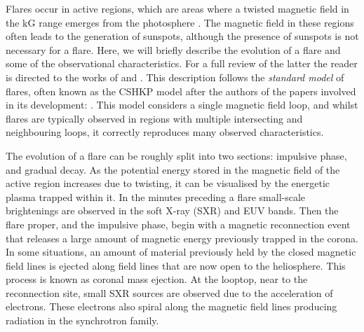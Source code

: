 Flares occur in active regions, which are areas where a twisted magnetic field in the kG range emerges from the photosphere \citep[For a review of active region evolution see][]{VanDriel-Gesztelyi2015}.
The magnetic field in these regions often leads to the generation of sunspots, although the presence of sunspots is not necessary for a flare.
Here, we will briefly describe the evolution of a flare and some of the observational characteristics.
For a full review of the latter the reader is directed to the works of \citet{Benz2008} and \citet{Fletcher2011}.
This description follows the \emph{standard model} of flares, often known as the CSHKP model after the authors of the papers involved in its development: \citet{Carmichael1964,Sturrock1966,Hirayama1974,Kopp1976}.
This model considers a single magnetic field loop, and whilst flares are typically observed in regions with multiple intersecting and neighbouring loops, it correctly reproduces many observed characteristics.

The evolution of a flare can be roughly split into two sections: impulsive phase, and gradual decay.
As the potential energy stored in the magnetic field of the active region increases due to twisting, it can be visualised by the energetic plasma trapped within it.
In the minutes preceding a flare small-scale brightenings are observed in the soft X-ray (SXR) and EUV bands.
Then the flare proper, and the impulsive phase, begin with a magnetic reconnection event that releases a large amount of magnetic energy previously trapped in the corona.
In some situations, an amount of material previously held by the closed magnetic field lines is ejected along field lines that are now open to the heliosphere.
This process is known as coronal mass ejection.
At the looptop, near to the reconnection site, small SXR sources are observed due to the acceleration of electrons.
These electrons also spiral along the magnetic field lines producing radiation in the synchrotron family.

